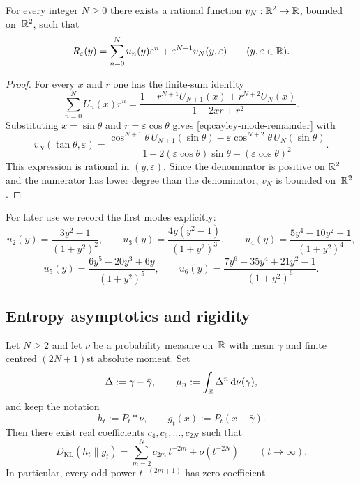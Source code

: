 \begin{proposition}%
\label{prop:cayley-mode-remainder}
For every integer $N\ge 0$ there exists a rational function
$v_N:\mathbb{R}^2\to\mathbb{R}$, bounded on~$\mathbb{R}^2$, such that
\begin{equation}\label{eq:cayley-mode-remainder}
R_\varepsilon(y)
=\sum_{n=0}^{N}u_n(y)\varepsilon^n+\varepsilon^{N+1}v_N(y,\varepsilon)
\qquad(y,\varepsilon\in\mathbb{R}).
\end{equation}
\end{proposition}

\begin{proof}
For every $x$ and $r$ one has the finite-sum identity
\[
\sum_{n=0}^{N}U_n(x)r^n
=\frac{1-r^{N+1}U_{N+1}(x)+r^{N+2}U_N(x)}{1-2xr+r^2}.
\]
Substituting $x=\sin\theta$ and $r=\varepsilon\cos\theta$ gives
\eqref{eq:cayley-mode-remainder} with
\[
v_N(\tan\theta,\varepsilon)
=\frac{\cos^{N+1}\theta\,U_{N+1}(\sin\theta)
-\varepsilon\cos^{N+2}\theta\,U_N(\sin\theta)}
{1-2(\varepsilon\cos\theta)\sin\theta+(\varepsilon\cos\theta)^2}.
\]
This expression is rational in $(y,\varepsilon)$.  Since the denominator
is positive on $\mathbb{R}^2$ and the numerator has lower degree than the
denominator, $v_N$ is bounded on~$\mathbb{R}^2$.
\end{proof}

For later use we record the first modes explicitly:
\begin{equation}\label{eq:cayley-first-modes}
u_2(y)=\frac{3y^2-1}{(1+y^2)^2},
\qquad
u_3(y)=\frac{4y(y^2-1)}{(1+y^2)^3},
\qquad
u_4(y)=\frac{5y^4-10y^2+1}{(1+y^2)^4},
\end{equation}
\begin{equation}\label{eq:cayley-next-modes}
u_5(y)=\frac{6y^5-20y^3+6y}{(1+y^2)^5},
\qquad
u_6(y)=\frac{7y^6-35y^4+21y^2-1}{(1+y^2)^6}.
\end{equation}

\subsection{Entropy asymptotics and rigidity}

\begin{theorem}%
\label{thm:poisson-kl-even-orders}
Let $N\ge 2$ and let $\nu$ be a probability measure on~$\mathbb{R}$ with mean
$\bar\gamma$ and finite centred $(2N+1)$st absolute moment.  Set
\[
\Delta:=\gamma-\bar\gamma,
\qquad
\mu_n:=\int_{\mathbb{R}}\Delta^n\,\mathrm{d}\nu(\gamma),
\]
and keep the notation
\[
h_t:=P_t*\nu,
\qquad
g_t(x):=P_t(x-\bar\gamma).
\]
Then there exist real coefficients $c_4,c_6,\dots,c_{2N}$ such that
\begin{equation}\label{eq:poisson-kl-even-orders}
D_{\mathrm{KL}}(h_t\|g_t)
=\sum_{m=2}^{N}c_{2m}\,t^{-2m}+o(t^{-2N})
\qquad(t\to\infty).
\end{equation}
In particular, every odd power $t^{-(2m+1)}$ has zero coefficient.
\end{theorem}

